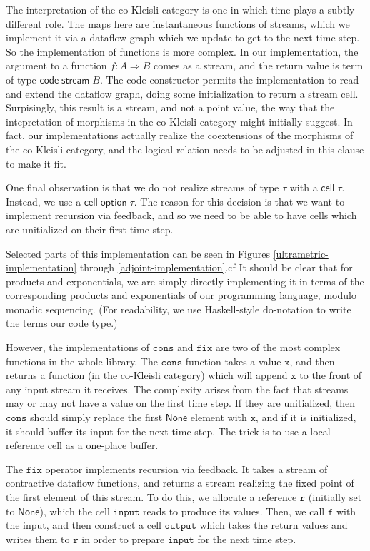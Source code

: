\documentclass[nocopyrightspace,preprint]{sigplanconf}
\newcommand{\term}[1]{\ensuremath{\mathtt{{#1}}}}
\newcommand{\To}{\Rightarrow}
\newcommand{\celltype}[1]{\mathsf{cell}\;{#1}}
\newcommand{\opttype}[1]{\mathsf{option}\;{#1}}
\newcommand{\comp}[1]{\mathsf{code}\;{#1}}
\newcommand{\streamtype}[1]{\mathsf{stream}\;{#1}}
\newcommand{\None}{\mathsf{None}}
\begin{document}
The interpretation of the co-Kleisli category is one in which time
plays a subtly different role. The maps here are instantaneous
functions of streams, which we implement it via a dataflow graph which
we update to get to the next time step. So the implementation of
functions is more complex. In our implementation, the argument to a
function $f : A \To B$ comes as a stream, and the return value is term
of type $\comp{\streamtype{B}}$. The code constructor permits the
implementation to read and extend the dataflow graph, doing some
initialization to return a stream cell. Surpisingly, this result is a
stream, and not a point value, the way that the intepretation of
morphisms in the co-Kleisli category might initially suggest. In fact,
our implementations actually realize the coextensions of the morphisms
of the co-Kleisli category, and the logical relation needs to be
adjusted in this clause to make it fit.

One final observation is that we do not realize streams of type $\tau$
with a $\celltype{\tau}$. Instead, we use a $\celltype{\opttype{\tau}}$. 
The reason for this decision is that we want to implement recursion via
feedback, and so we need to be able to have cells which are unitialized
on their first time step. 

Selected parts of this implementation can be seen in Figures
\ref{ultrametric-implementation} through \ref{adjoint-implementation}.cf
It should be clear that for products and exponentials, we are simply
directly implementing it in terms of the corresponding products and
exponentials of our programming language, modulo monadic
sequencing. (For readability, we use Haskell-style do-notation to
write the terms our \textsf{code} type.)

However, the implementations of \term{cons} and \term{fix} are two of
the most complex functions in the whole library. The \term{cons}
function takes a value \term{x}, and then returns a function (in the
co-Kleisli category) which will append \term{x} to the front of any
input stream it receives. The complexity arises from the fact that
streams may or may not have a value on the first time step. If they
are unitialized, then \term{cons} should simply replace the first
$\None$ element with \term{x}, and if it is initialized, it should
buffer its input for the next time step. The trick is to use a local
reference cell as a one-place buffer. 

The $\term{fix}$ operator implements recursion via feedback. It takes
a stream of contractive dataflow functions, and returns a stream
realizing the fixed point of the first element of this stream. To do
this, we allocate a reference \term{r} (initially set to $\None$), which
the cell \term{input} reads to produce its values. Then, we call \term{f}
with the input, and then construct a cell \term{output} which takes the
return values and writes them to \term{r} in order to prepare \term{input}
for the next time step. 
\end{document}
